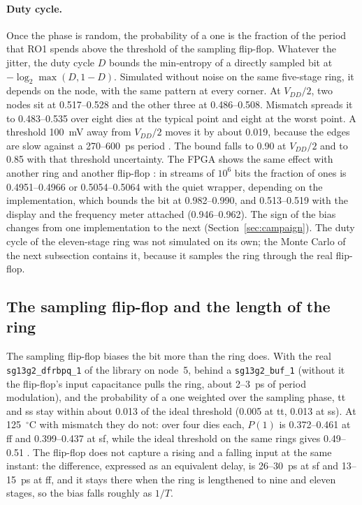 \paragraph{Duty cycle.} Once the phase is random, the probability of a
one is the fraction of the period that RO1 spends above the threshold of
the sampling flip-flop. Whatever the jitter, the duty cycle $D$ bounds the
min-entropy of a directly sampled bit at $-\log_2 \max(D, 1-D)$. Simulated
without noise on the same five-stage ring, it depends on the node, with
the same pattern at every corner. At $V_{DD}/2$, two nodes sit at
0.517--0.528 and the other three at 0.486--0.508. Mismatch spreads it to
0.483--0.535 over eight dies at the typical point and eight at the worst
point. A threshold 100~mV away from $V_{DD}/2$ moves it by about 0.019,
because the edges are slow against a 270--600~ps period \simu{}. The bound
falls to 0.90 at $V_{DD}/2$ and to 0.85 with that threshold uncertainty.
The \ac{FPGA} shows the same effect with another ring and another
flip-flop \meas{}: in streams of $10^6$ bits the fraction of ones is
0.4951--0.4966 or 0.5054--0.5064 with the quiet wrapper, depending on the
implementation, which bounds the bit at 0.982--0.990, and 0.513--0.519
with the display and the frequency meter attached (0.946--0.962). The
sign of the bias changes from one implementation to the next
(Section~\ref{sec:campaign}). The duty cycle of the eleven-stage ring was
not simulated on its own; the Monte Carlo of the next subsection contains
it, because it samples the ring through the real flip-flop.

\subsection{The sampling flip-flop and the length of the ring}
\label{sec:ff_mc}

The sampling flip-flop biases the bit more than the ring does. With the
real \texttt{sg13g2\_\allowbreak dfrbpq\_1} of the library on node~5, behind a
\texttt{sg13g2\_\allowbreak buf\_1} (without it the flip-flop's input capacitance
pulls the ring, about 2--3~ps of period modulation), and the probability
of a one weighted over the sampling phase, tt and ss stay within about
0.013 of the ideal threshold (0.005 at tt, 0.013 at ss). At 125~$^\circ$C with mismatch they do not: over four
dies each, $P(1)$ is 0.372--0.461 at ff and 0.399--0.437 at sf, while the
ideal threshold on the same rings gives 0.49--0.51 \simu{}. The flip-flop
does not capture a rising and a falling input at the same instant: the
difference, expressed as an equivalent delay, is 26--30~ps at sf and
13--15~ps at ff, and it stays there when the ring is lengthened to nine
and eleven stages, so the bias falls roughly as $1/T$.

